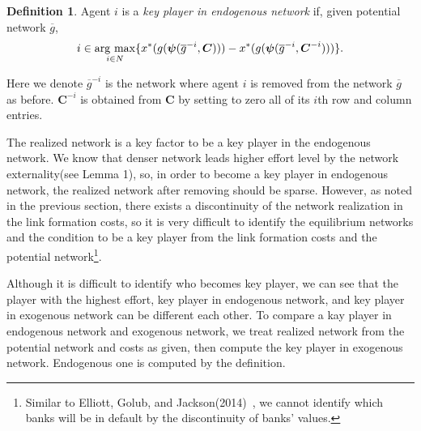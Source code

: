 \documentclass[12pt]{article}
\theoremstyle{definition}
\newtheorem{definition}{Definition}
\newcommand{\bm}[1]{\boldsymbol{#1}}
\newcommand{\argmax}{\mathop{\rm arg~max}\limits}
\begin{document}
\begin{definition}
Agent $i$ is a {\it{key player in endogenous network}} if, given potential network $\overline{g}$,
\[ i \in \argmax_{i \in N} \{ x^*(g(\bm{\psi}({\overline{g}}^{-i}, \bm{C}))) - x^*(g(\bm{\psi}({\overline{g}}^{-i}, \bm{C}^{-i}))) \}. \]
\end{definition}
Here we denote ${\overline{g}}^{-i}$ is the network where agent $i$ is removed from the network $\overline{g}$ as before.
$\bm{C}^{-i}$ is obtained from $\bm{C}$ by setting to zero all of its $i$th row and column entries.

The realized network is a key factor to be a key player in the endogenous network.
We know that denser network leads higher effort level by the network externality(see Lemma 1), so, in order to become a key player in endogenous network, the realized network after removing should be sparse.
However, as noted in the previous section, there exists a discontinuity of the network realization in the link formation costs, so it is very difficult to identify the equilibrium networks and the condition to be a key player from the link formation costs and the potential network\footnote{Similar to Elliott, Golub, and Jackson(2014)~\cite{contagion}, we cannot identify which banks will be in default by the discontinuity of banks' values.}.

Although it is difficult to identify who becomes key player, we can see that the player with the highest effort, key player in endogenous network, and key player in exogenous network can be different each other.
To compare a kay player in endogenous network and exogenous network, we treat realized network from the potential network and costs as given, then compute the key player in exogenous network.
Endogenous one is computed by the definition.
\end{document}
